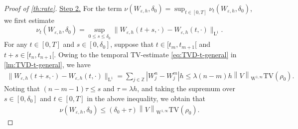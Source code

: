 \documentclass[10pt]{amsart}
\theoremstyle{plain}
\theoremstyle{definition}
\numberwithin{equation}{section}
\newcommand{\eps}{{\varepsilon}}
\newcommand{\norm}[1]{\left\lVert#1\right\rVert}
\begin{document}
\begin{proof}[Proof of \cref{th:rate}]
\uline{Step 2.} For the term $\nu(W_{\eps,h}, \delta_0)=\sup_{t\in[0,T]}\nu_t(W_{\eps,h}, \delta_0)$, we first estimate
\[ \nu_t(W_{\eps,h}, \delta_0)= \sup_{0\leq s\leq\delta_0} \|W_{\eps,h}(t+s,\cdot)-W_{\eps,h}(t,\cdot)\|_{\mathrm{L}^1}. \]
For any $t\in[0,T]$ and $s\in[0,\delta_0]$, suppose that $t\in[t_m,t_{m+1}[$ and $t+s\in[t_n,t_{n+1}[$. Owing to the temporal TV-estimate \cref{eq:TVD-t-general} in \cref{lm:TVD-t-general}, we have
\begin{align*}
    \|W_{\eps,h}(t+s,\cdot)-W_{\eps,h}(t,\cdot)\|_{\mathrm{L}^1} = \sum_{j\in\mathbb{Z}} |W_j^n-W_j^m| h \leq \lambda (n-m)h \norm{V}_{\mathrm{W}^{1,\infty}} \mathrm{TV}(\rho_0).
\end{align*}
Noting that $(n-m-1)\tau\le s$ and $\tau=\lambda h$, and taking the supremum over $s\in[0,\delta_0]$ and $t\in[0,T]$ in the above inequality, we obtain that
\begin{align*}
    \nu\left(W_{\eps,h}, \delta_0\right) \leq (\delta_0+\tau) \norm{V}_{\mathrm{W}^{1,\infty}} \mathrm{TV}(\rho_0).
\end{align*}


\end{proof}
\end{document}
